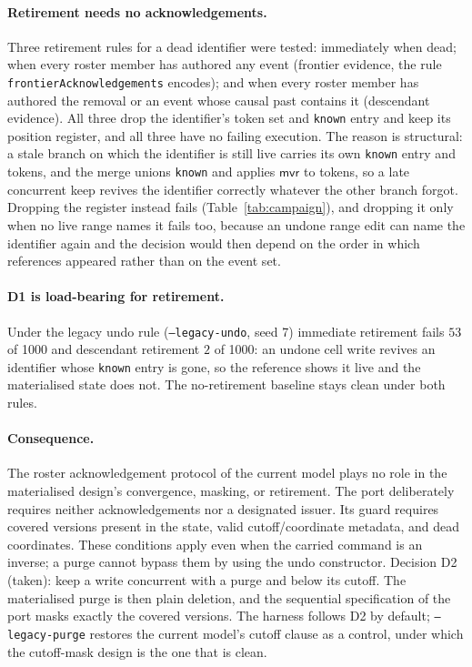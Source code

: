 \documentclass[11pt]{article}
\newcommand{\lean}[1]{\texttt{\def\_{\textunderscore\allowbreak}#1}}
\newcommand{\mvr}{\mathsf{mvr}}
\begin{document}
\paragraph{Retirement needs no acknowledgements.} Three retirement rules
for a dead identifier were tested: immediately when dead; when every roster
member has authored any event (frontier evidence, the rule
\lean{frontierAcknowledgements} encodes); and when every roster member has
authored the removal or an event whose causal past contains it (descendant
evidence). All three drop the identifier's token set and \lean{known} entry
and keep its position register, and all three have no failing execution. The
reason is structural: a stale branch on which the identifier is still live
carries its own \lean{known} entry and tokens, and the merge unions
\lean{known} and applies $\mvr$ to tokens, so a late concurrent keep revives
the identifier correctly whatever the other branch forgot. Dropping the
register instead fails (Table~\ref{tab:campaign}), and dropping it only when
no live range names it fails too, because an undone range edit can name the
identifier again and the decision would then depend on the order in which
references appeared rather than on the event set.

\paragraph{D1 is load-bearing for retirement.} Under the legacy undo rule
(\lean{--legacy-undo}, seed 7) immediate retirement fails $53$ of 1000 and
descendant retirement $2$ of 1000: an undone cell write revives an identifier
whose \lean{known} entry is gone, so the reference shows it live and the
materialised state does not. The no-retirement baseline stays clean under
both rules.

\paragraph{Consequence.} The roster acknowledgement protocol of the current
model plays no role in the materialised design's convergence, masking, or
retirement. The port deliberately requires neither acknowledgements nor a
designated issuer. Its guard requires covered versions present in the state,
valid cutoff/coordinate metadata, and dead coordinates. These conditions
apply even when the carried command is an inverse; a purge cannot bypass
them by using the undo constructor.
Decision D2 (taken): keep a write concurrent with a purge and below its
cutoff. The materialised purge is then plain deletion, and the sequential
specification of the port masks exactly the covered versions. The harness
follows D2 by default; \lean{--legacy-purge} restores the current model's
cutoff clause as a control, under which the cutoff-mask design is the one
that is clean.
\end{document}
